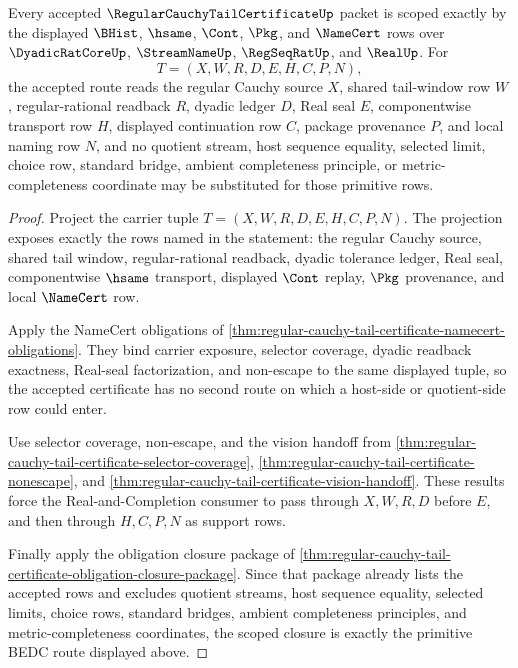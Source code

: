 \begin{theorem}
\label{thm:regular-cauchy-tail-certificate-primitive-scope-lock}
Every accepted $\RegularCauchyTailCertificateUp$ packet is scoped exactly by the displayed $\BHist$, $\hsame$, $\Cont$, $\Pkg$, and $\NameCert$ rows over $\DyadicRatCoreUp$, $\StreamNameUp$, $\RegSeqRatUp$, and $\RealUp$. For
$$
T=(X,W,R,D,E,H,C,P,N),
$$
the accepted route reads the regular Cauchy source $X$, shared tail-window row $W$, regular-rational readback $R$, dyadic ledger $D$, Real seal $E$, componentwise transport row $H$, displayed continuation row $C$, package provenance $P$, and local naming row $N$, and no quotient stream, host sequence equality, selected limit, choice row, standard bridge, ambient completeness principle, or metric-completeness coordinate may be substituted for those primitive rows.
\end{theorem}
\begin{proof}
Project the carrier tuple $T=(X,W,R,D,E,H,C,P,N)$. The projection exposes exactly the rows named in the statement: the regular Cauchy source, shared tail window, regular-rational readback, dyadic tolerance ledger, Real seal, componentwise $\hsame$ transport, displayed $\Cont$ replay, $\Pkg$ provenance, and local $\NameCert$ row.

Apply the NameCert obligations of \autoref{thm:regular-cauchy-tail-certificate-namecert-obligations}. They bind carrier exposure, selector coverage, dyadic readback exactness, Real-seal factorization, and non-escape to the same displayed tuple, so the accepted certificate has no second route on which a host-side or quotient-side row could enter.

Use selector coverage, non-escape, and the vision handoff from \autoref{thm:regular-cauchy-tail-certificate-selector-coverage}, \autoref{thm:regular-cauchy-tail-certificate-nonescape}, and \autoref{thm:regular-cauchy-tail-certificate-vision-handoff}. These results force the Real-and-Completion consumer to pass through $X,W,R,D$ before $E$, and then through $H,C,P,N$ as support rows.

Finally apply the obligation closure package of \autoref{thm:regular-cauchy-tail-certificate-obligation-closure-package}. Since that package already lists the accepted rows and excludes quotient streams, host sequence equality, selected limits, choice rows, standard bridges, ambient completeness principles, and metric-completeness coordinates, the scoped closure is exactly the primitive BEDC route displayed above.
\end{proof}

